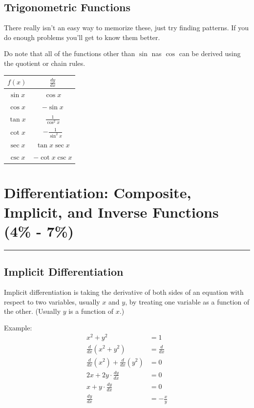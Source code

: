 \documentclass[12pt]{article}
\newcommand{\fline}{\par\noindent\rule{\textwidth}{0.1pt}} %
\begin{document}
\subsection{Trigonometric Functions}
There really isn't an easy way to memorize these, just try finding patterns. If you do enough problems you'll get to know them better.

Do note that all of the functions other than $\sin$ nas $\cos$ can be derived using the quotient or chain rules.
\begin{center}
    \begin{tabular}{|c|c|}
        \hline
        $f(x)$    & $\frac{dy}{dx}$        \\
        \hline \hline
        $\sin{x}$ & $\cos{x}$              \\
        \hline
        $\cos{x}$ & $-\sin{x}$             \\
        \hline
        $\tan{x}$ & $\frac{1}{\cos^2{x}}$  \\
        \hline \hline
        $\cot{x}$ & $-\frac{1}{\sin^2{x}}$ \\
        \hline
        $\sec{x}$ & $\tan{x} \sec{x}$      \\
        \hline
        $\csc{x}$ & $-\cot{x} \csc{x}$     \\
        \hline
    \end{tabular}
\end{center}

\section{Differentiation: Composite, Implicit, and Inverse Functions (4\% - 7\%)}
\fline
\subsection{Implicit Differentiation}
Implicit differentiation is taking the derivative of both sides of an equation with respect to two variables, usually $x$ and $y$, by treating one variable as a function of the other. (Usually $y$ is a function of $x$.)

\noindent Example:
\begin{align*}
    x^2 + y^2                                                         & = 1            \\
    \frac{d}{dx} \left( x^2 + y^2 \right)                             & = \frac{d}{dx} \\[6pt]
    \frac{d}{dx} \left( x^2 \right) + \frac{d}{dx} \left( y^2 \right) & = 0            \\[6pt]
    2x + 2y \cdot \frac{dy}{dx}                                       & = 0            \\[6pt]
    x + y \cdot \frac{dy}{dx}                                         & = 0            \\[6pt]
    \frac{dy}{dx}                                                     & = -\frac{x}{y}
\end{align*}
\end{document}
